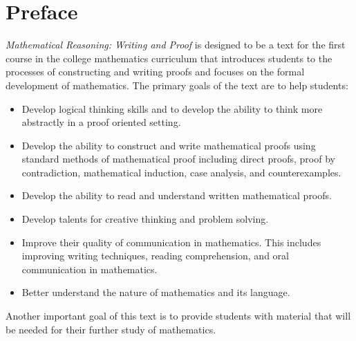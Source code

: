 
\chapter{Preface} \label{fm:preface}
\emph{Mathematical Reasoning:  Writing and Proof} is designed to be a text for the first course in the college mathematics curriculum that introduces students to the processes of constructing and writing proofs and focuses on the formal development of mathematics.    The primary goals of the text are to help students:
\begin{itemize}
  \item Develop logical thinking skills and to develop the ability to think more abstractly in a proof oriented setting.
  \item Develop the ability to construct and write mathematical proofs using standard methods of mathematical proof including direct proofs, proof by contradiction, mathematical induction, case analysis, and counterexamples.
  \item Develop the ability to read and understand written mathematical proofs. 
  \item Develop talents for creative thinking and problem solving.
  \item Improve their quality of communication in mathematics.  This includes improving writing techniques, reading comprehension, and oral communication in mathematics.
  \item Better understand the nature of mathematics and its language.
\end{itemize}
Another important goal of this text is to provide students with material that will be needed for their further study of mathematics.

